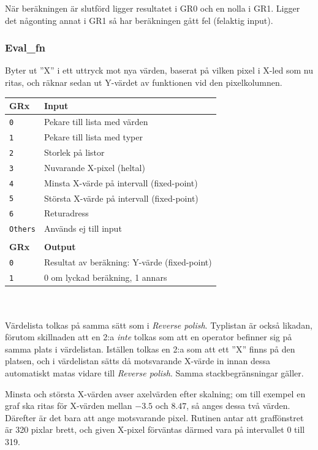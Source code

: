 \documentclass[]{article}
\begin{document}
När beräkningen är slutförd ligger resultatet i GR0 och en nolla i GR1. Ligger det någonting annat i GR1 så har beräkningen gått fel (felaktig input).

\subsubsection{Eval\_fn}

Byter ut ''X'' i ett uttryck mot nya värden, baserat på vilken pixel i X-led som nu ritas, och räknar sedan ut Y-värdet av funktionen vid den pixelkolumnen.

\begin{tabular}{ll}
	\textbf{GRx}    & \textbf{Input}               \\ \hline
	\texttt{0}      & Pekare till lista med värden \\
	\texttt{1}      & Pekare till lista med typer  \\
	\texttt{2}      & Storlek på listor            \\
	\texttt{3}      & Nuvarande X-pixel (heltal)   \\
	\texttt{4}      & Minsta X-värde på intervall (fixed-point) \\
	\texttt{5}      & Största X-värde på intervall (fixed-point) \\
        \texttt{6}      & Returadress                  \\
        \texttt{Others} & Används ej till input        \\
                        &                              \\
	\textbf{GRx}    & \textbf{Output}              \\ \hline
	\texttt{0}      & Resultat av beräkning: Y-värde (fixed-point) \\
	\texttt{1}      & 0 om lyckad beräkning, 1 annars
\end{tabular}
\\\\
\noindent
Värdelista tolkas på samma sätt som i \textit{Reverse polish}. Typlistan är också likadan, förutom skillnaden att en 2:a \textit{inte} tolkas som att en operator befinner sig på samma plats i värdelistan. Iställen tolkas en 2:a som att ett ''X'' finns på den platsen, och i värdelistan sätts då motsvarande X-värde in innan dessa automatiskt matas vidare till \textit{Reverse polish}. Samma stackbegränsningar gäller.

Minsta och största X-värden avser axelvärden efter skalning; om till exempel en graf ska ritas för X-värden mellan $-3.5$ och $8.47$, så anges dessa två värden. Därefter är det bara att ange motsvarande pixel. Rutinen antar att graffönstret är 320 pixlar brett, och given X-pixel förväntas därmed vara på intervallet 0 till 319.
\end{document}

